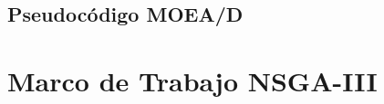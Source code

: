 \documentclass[letterpaper,10pt]{article}
\begin{document}
% 
% 


\subsection{Pseudocódigo MOEA/D}

\section{Marco de Trabajo NSGA-III}
\end{document}
